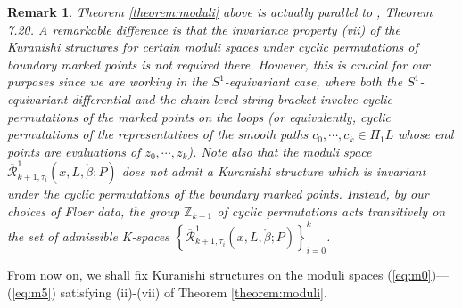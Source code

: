 \documentclass[a4paper]{article}
\newtheorem{remark}[theorem]{Remark}
\numberwithin{equation}{section}
\begin{document}
\begin{remark}\label{remark:invariance}
Theorem \ref{theorem:moduli} above is actually parallel to \cite{ki2}, Theorem 7.20. A remarkable difference is that the invariance property (vii) of the Kuranishi structures for certain moduli spaces under cyclic permutations of boundary marked points is not required there. However, this is crucial for our purposes since we are working in the $S^1$-equivariant case, where both the $S^1$-equivariant differential and the chain level string bracket involve cyclic permutations of the marked points on the loops (or equivalently, cyclic permutations of the representatives of the smooth paths $c_0,\cdots,c_k\in\Pi_1L$ whose end points are evaluations of $z_0,\cdots,z_k$). Note also that the moduli space $\overline{\mathcal{R}}_{k+1,\tau_i}^1(x,L,\ring{\beta};P)$ does not admit a Kuranishi structure which is invariant under the cyclic permutations of the boundary marked points. Instead, by our choices of Floer data, the group $\mathbb{Z}_{k+1}$ of cyclic permutations acts transitively on the set of admissible K-spaces $\left\{\overline{\mathcal{R}}_{k+1,\tau_i}^1(x,L,\ring{\beta};P)\right\}_{i=0}^k$.
\end{remark}

From now on, we shall fix Kuranishi structures on the moduli spaces (\ref{eq:m0})---(\ref{eq:m5}) satisfying (ii)-(vii) of Theorem \ref{theorem:moduli}.
\end{document}
